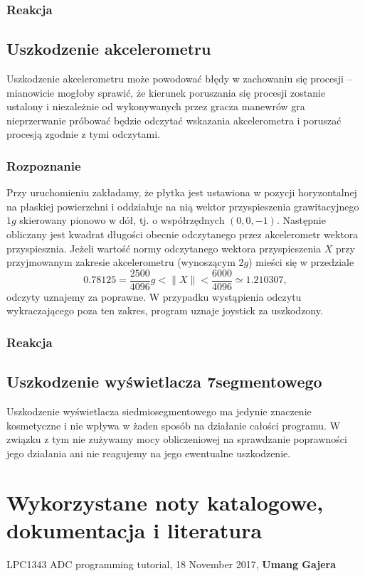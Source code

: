 \documentclass[a4paper,12pt,twoside]{article}
\theoremstyle{plain}
\theoremstyle{definition}
\theoremstyle{remark}
\begin{document}
		\subsubsection{Reakcja}
	\subsection{Uszkodzenie akcelerometru}
	Uszkodzenie akcelerometru może powodować błędy w zachowaniu się procesji -- mianowicie mogłoby sprawić, że kierunek poruszania się procesji zostanie ustalony i niezależnie od wykonywanych przez gracza manewrów gra nieprzerwanie próbować będzie odczytać wskazania akcelerometra i poruszać procesją zgodnie z tymi odczytami.
	\subsubsection{Rozpoznanie}
	Przy uruchomieniu zakładamy, że płytka jest ustawiona w pozycji horyzontalnej na płaskiej powierzchni i oddziałuje na nią wektor przyspieszenia grawitacyjnego $1g$ skierowany pionowo w dół, tj. o współrzędnych $(0,0,-1)$. Następnie obliczany jest kwadrat długości obecnie odczytanego przez akcelerometr wektora przyspiesznia. Jeżeli wartość normy odczytanego wektora przyspieszenia $X$ przy przyjmowanym zakresie akcelerometru (wynoszącym $2g$) mieści się w przedziale
	$$0.78125 = \frac{2500}{4096} g < \| X \| < \frac{6000}{4096} \simeq 1.210307 ,$$
	odczyty uznajemy za poprawne. W przypadku wystąpienia odczytu wykraczającego poza ten zakres, program uznaje joystick za uszkodzony.
	\subsubsection{Reakcja}
	
	\subsection{Uszkodzenie wyświetlacza 7segmentowego}
	Uszkodzenie wyświetlacza siedmiosegmentowego ma jedynie znaczenie kosmetyczne i nie wpływa w żaden sposób na działanie całości programu. W związku z tym nie zużywamy mocy obliczeniowej na sprawdzanie poprawności jego działania ani nie reagujemy na jego ewentualne uszkodzenie.
\section{Wykorzystane noty katalogowe, dokumentacja i literatura}
		
		
\begin{thebibliography}{abcd}
{LPC1343 ADC programming tutorial},
	{18 November 2017},
	\textbf{Umang Gajera}
\end{thebibliography}
\end{document}
